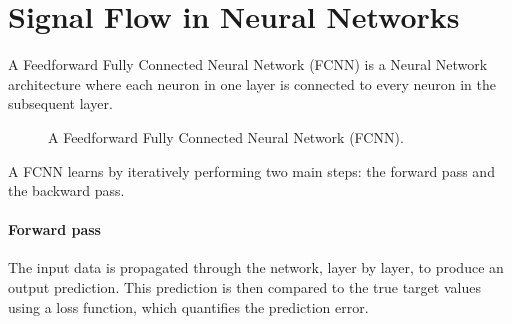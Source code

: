 \section*{Signal Flow in Neural Networks}

A Feedforward Fully Connected Neural Network (FCNN) is a Neural Network architecture where each neuron in one layer is connected to every neuron in the subsequent layer.

\begin{figure}[h]
    \centering
    \caption{A Feedforward Fully Connected Neural Network (FCNN).}
    \label{fig:fcnn}
\end{figure}

A FCNN learns by iteratively performing two main steps: the forward pass and the backward pass.

\paragraph{Forward pass} The input data is propagated through the network, layer by layer, to produce an output prediction. This prediction is then compared to the true target values using a loss function, which quantifies the prediction error.

